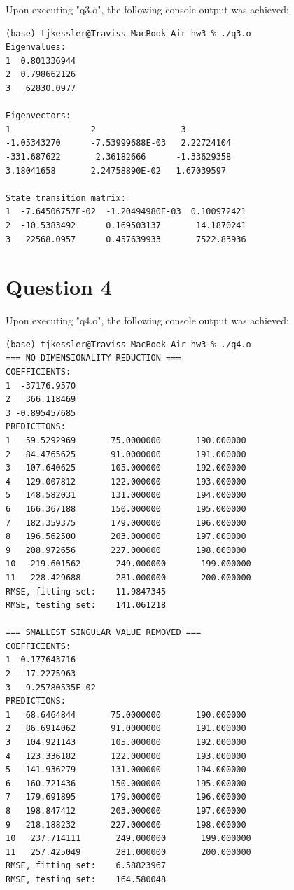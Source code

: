 \documentclass{report}
\begin{document}
	Upon executing "q3.o", the following console output was achieved:
	
	\begin{lstlisting}
(base) tjkessler@Traviss-MacBook-Air hw3 % ./q3.o
Eigenvalues:
1  0.801336944    
2  0.798662126    
3   62830.0977    

Eigenvectors:
1                2                 3
-1.05343270      -7.53999688E-03   2.22724104    
-331.687622       2.36182666      -1.33629358    
3.18041658       2.24758890E-02   1.67039597    

State transition matrix:
1  -7.64506757E-02  -1.20494980E-03  0.100972421    
2  -10.5383492      0.169503137       14.1870241    
3   22568.0957      0.457639933       7522.83936 
	\end{lstlisting}

	\section*{Question 4}
	
	Upon executing "q4.o", the following console output was achieved:

	\begin{lstlisting}
(base) tjkessler@Traviss-MacBook-Air hw3 % ./q4.o 
=== NO DIMENSIONALITY REDUCTION ===
COEFFICIENTS:
1  -37176.9570    
2   366.118469    
3 -0.895457685    
PREDICTIONS:
1   59.5292969       75.0000000       190.000000    
2   84.4765625       91.0000000       191.000000    
3   107.640625       105.000000       192.000000    
4   129.007812       122.000000       193.000000    
5   148.582031       131.000000       194.000000    
6   166.367188       150.000000       195.000000    
7   182.359375       179.000000       196.000000    
8   196.562500       203.000000       197.000000    
9   208.972656       227.000000       198.000000    
10   219.601562       249.000000       199.000000    
11   228.429688       281.000000       200.000000    
RMSE, fitting set:    11.9847345    
RMSE, testing set:    141.061218    

=== SMALLEST SINGULAR VALUE REMOVED ===
COEFFICIENTS:
1 -0.177643716    
2  -17.2275963    
3   9.25780535E-02
PREDICTIONS:
1   68.6464844       75.0000000       190.000000    
2   86.6914062       91.0000000       191.000000    
3   104.921143       105.000000       192.000000    
4   123.336182       122.000000       193.000000    
5   141.936279       131.000000       194.000000    
6   160.721436       150.000000       195.000000    
7   179.691895       179.000000       196.000000    
8   198.847412       203.000000       197.000000    
9   218.188232       227.000000       198.000000    
10   237.714111       249.000000       199.000000    
11   257.425049       281.000000       200.000000    
RMSE, fitting set:    6.58823967    
RMSE, testing set:    164.580048 
	\end{lstlisting}
\end{document}
